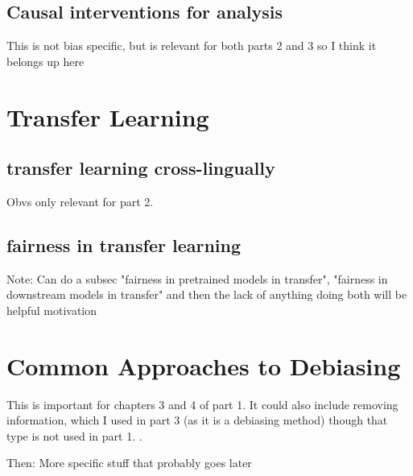 \subsection{Causal interventions for analysis}
This is not bias specific, but is relevant for both parts 2 and 3 so I think it belongs up here


\section{Transfer Learning}
\subsection{transfer learning  cross-lingually}
Obvs only relevant for part 2.
\subsection{fairness in transfer learning}

Note: Can do a subsec "fairness in pretrained models in transfer", "fairness in downstream models in transfer" and then the lack of anything doing both will be helpful motivation



\section{Common Approaches to Debiasing}
This is important for chapters 3 and 4 of part 1. It could also include removing information, which I used in part 3 (as it is a debiasing method) though that type is not used in part 1. 
.

Then: More specific stuff that probably goes later
